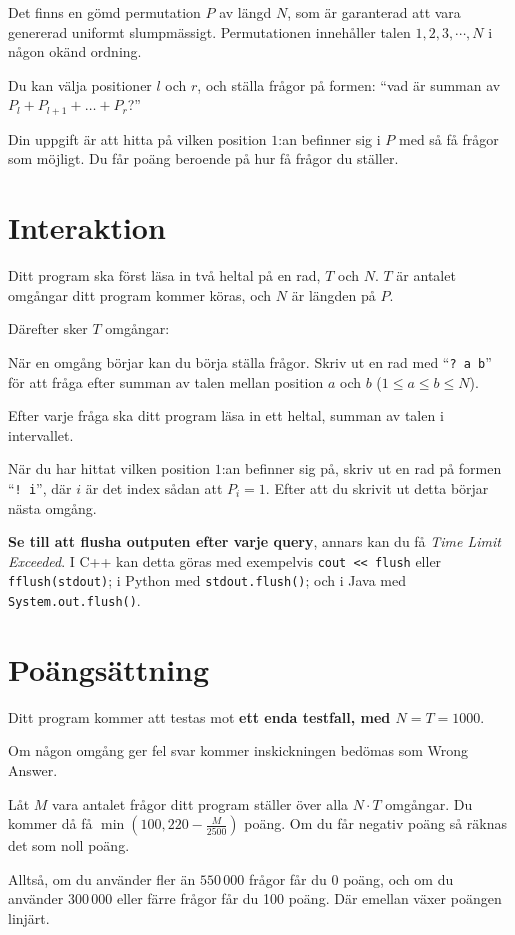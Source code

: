 
Det finns en gömd permutation $P$ av längd $N$, som är garanterad att vara genererad uniformt slumpmässigt.
Permutationen innehåller talen $1, 2, 3, \cdots, N$ i någon okänd ordning.

Du kan välja positioner $l$ och $r$, och ställa frågor på formen: ``vad är summan av $P_l + P_{l+1} + \ldots + P_r$?''

Din uppgift är att hitta på vilken position $1$:an befinner sig i $P$ med så få frågor som möjligt.
Du får poäng beroende på hur få frågor du ställer.

\section*{Interaktion}

Ditt program ska först läsa in två heltal på en rad, $T$ och $N$. 
$T$ är antalet omgångar ditt program kommer köras, och $N$ är längden på $P$.

Därefter sker $T$ omgångar:

När en omgång börjar kan du börja ställa frågor. Skriv ut en rad med ``\verb|? a b|'' för
att fråga efter summan av talen mellan position $a$ och $b$ ($1 \leq a \leq b \leq N$).

Efter varje fråga ska ditt program läsa in ett heltal, summan av talen i intervallet.

När du har hittat vilken position $1$:an befinner sig på, skriv ut en rad på formen ``\verb|! i|'',
där $i$ är det index sådan att $P_i = 1$. Efter att du skrivit ut detta börjar nästa omgång.

\textbf{Se till att flusha outputen efter varje query}, annars kan du få \textit{Time Limit Exceeded}.
I C++ kan detta göras med exempelvis \texttt{cout << flush}
eller \texttt{fflush(stdout)};
i Python med \texttt{stdout.flush()};
och i Java med \texttt{System.out.flush()}.

\section*{Poängsättning}

Ditt program kommer att testas mot \textbf{ett enda testfall, med $N = T = 1000$}.

Om någon omgång ger fel svar kommer inskickningen bedömas som Wrong Answer.

Låt $M$ vara antalet frågor ditt program ställer över alla $N \cdot T$ omgångar. Du kommer då få
$\min(100, 220 - \frac{M}{2500})$ poäng. Om du får negativ poäng så räknas det som noll poäng.

Alltså, om du använder fler än $550\,000$ frågor får du 0 poäng, och
om du använder $300\,000$ eller färre frågor får du 100 poäng. Där emellan växer poängen linjärt.
